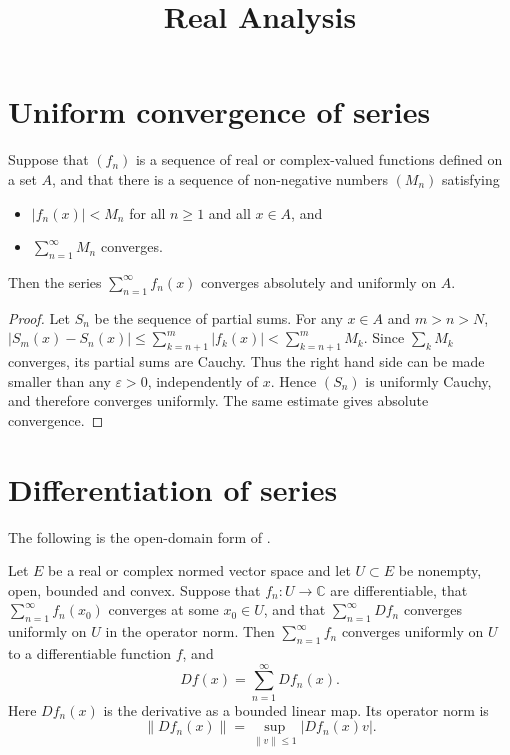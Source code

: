 



\title{Real Analysis}
\maketitle

\label{section-phantom}

\tableofcontents

\section{Uniform convergence of series}
\label{section-uniform-convergence-series}

\begin{theorem}
\label{theorem-m-test}
Suppose that $(f_n)$ is a sequence of real or
complex-valued functions defined on a set
$A$, and that there is a sequence of
non-negative numbers $(M_n)$ satisfying
\begin{itemize}
\item $|f_n(x)|<M_n$ for all $n\geq1$ and
all $x\in A$, and
\item $\sum_{n=1}^\infty M_n$ converges.
\end{itemize}
Then the series
$\sum_{n=1}^\infty f_n(x)$ converges
absolutely and uniformly on $A$.
\end{theorem}

\begin{proof}
Let $S_n$ be the sequence of partial sums.
For any $x\in A$ and $m>n>N$,
$
|S_m(x)-S_n(x)|
\leq
\sum_{k=n+1}^m |f_k(x)|
<
\sum_{k=n+1}^m M_k.
$
Since $\sum_k M_k$ converges, its partial
sums are Cauchy. Thus the right hand side can
be made smaller than any $\varepsilon>0$,
independently of $x$. Hence $(S_n)$ is
uniformly Cauchy, and therefore converges
uniformly. The same estimate gives absolute
convergence.
\end{proof}

\section{Differentiation of series}
\label{section-differentiation-series}

The following is the open-domain form of
\cite[Section 16.3.5, Corollary 5,
pp.~389--390]{zo2}.

\begin{theorem}
\label{theorem-differentiation-series}
Let $E$ be a real or complex normed vector
space and let $U\subset E$ be nonempty,
open, bounded and convex. Suppose that
$f_n:U\to\mathbb{C}$ are differentiable,
that $\sum_{n=1}^{\infty}f_n(x_0)$
converges at some $x_0\in U$, and that
$\sum_{n=1}^{\infty}Df_n$ converges
uniformly on $U$ in the operator norm.
Then $\sum_{n=1}^{\infty}f_n$ converges
uniformly on $U$ to a differentiable
function $f$, and
$$
Df(x)=\sum_{n=1}^{\infty}Df_n(x).
$$
Here $Df_n(x)$ is the derivative as a
bounded linear map. Its operator norm is
$$
\|Df_n(x)\|
=\sup_{\|v\|\leq1}|Df_n(x)v|.
$$
\end{theorem}

